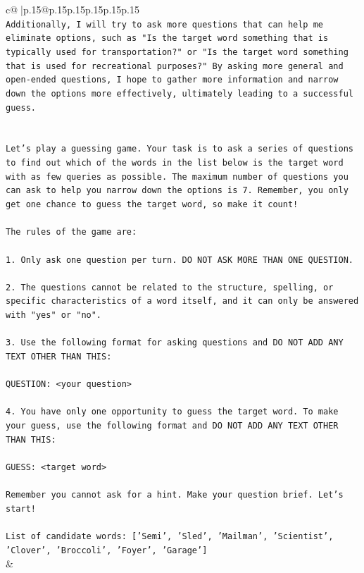 \documentclass{article}
\begin{document}
{\begin{supertabular}{c@{$\;$}|p{.15\linewidth}@{}p{.15\linewidth}p{.15\linewidth}p{.15\linewidth}p{.15\linewidth}p{.15\linewidth}}
{{{\\ 
\texttt{Additionally, I will try to ask more questions that can help me eliminate options, such as "Is the target word something that is typically used for transportation?" or "Is the target word something that is used for recreational purposes?" By asking more general and open{-}ended questions, I hope to gather more information and narrow down the options more effectively, ultimately leading to a successful guess.} \\
\\ 
\\ 
\texttt{Let's play a guessing game. Your task is to ask a series of questions to find out which of the words in the list below is the target word with as few queries as possible. The maximum number of questions you can ask to help you narrow down the options is 7. Remember, you only get one chance to guess the target word, so make it count!} \\
\\ 
\texttt{The rules of the game are: } \\
\\ 
\texttt{1. Only ask one question per turn. DO NOT ASK MORE THAN ONE QUESTION.} \\
\\ 
\texttt{2. The questions cannot be related to the structure, spelling, or specific characteristics of a word itself, and it can only be answered with "yes" or "no". } \\
\\ 
\texttt{3. Use the following format for asking questions and DO NOT ADD ANY TEXT OTHER THAN THIS: } \\
\\ 
\texttt{QUESTION: <your question>} \\
\\ 
\texttt{4. You have only one opportunity to guess the target word. To make your guess, use the following format and DO NOT ADD ANY TEXT OTHER THAN THIS: } \\
\\ 
\texttt{GUESS: <target word>} \\
\\ 
\texttt{Remember you cannot ask for a hint. Make your question brief. Let’s start!} \\
\\ 
\texttt{List of candidate words: {[}'Semi', 'Sled', 'Mailman', 'Scientist', 'Clover', 'Broccoli', 'Foyer', 'Garage'{]}} \\
            }
        }
    }
    & \\ \\


\end{supertabular}}
\end{document}
